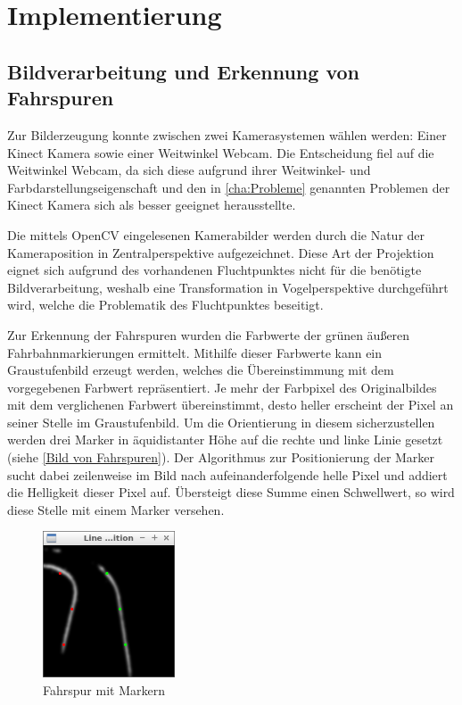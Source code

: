 \section{Implementierung}
\label{cha:Implementierung}
\subsection{Bildverarbeitung und Erkennung von Fahrspuren}
\label{sec:spurerkennung}

Zur Bilderzeugung konnte zwischen zwei Kamerasystemen wählen werden: Einer Kinect Kamera sowie einer Weitwinkel Webcam. Die Entscheidung fiel auf die Weitwinkel Webcam, da sich diese aufgrund ihrer Weitwinkel- und Farbdarstellungseigenschaft und den in \autoref{cha:Probleme} genannten Problemen der Kinect Kamera sich als besser geeignet herausstellte. 

Die mittels OpenCV eingelesenen Kamerabilder werden durch die Natur der Kameraposition in Zentralperspektive aufgezeichnet. Diese Art der Projektion eignet sich aufgrund des vorhandenen Fluchtpunktes nicht für die benötigte Bildverarbeitung, weshalb eine Transformation in Vogelperspektive durchgeführt wird, welche die Problematik des Fluchtpunktes beseitigt.

Zur Erkennung der Fahrspuren wurden die Farbwerte der grünen äußeren Fahrbahnmarkierungen ermittelt. Mithilfe dieser Farbwerte kann ein Graustufenbild erzeugt werden, welches die Übereinstimmung mit dem vorgegebenen Farbwert repräsentiert. Je mehr der Farbpixel des Originalbildes mit dem verglichenen Farbwert übereinstimmt, desto heller erscheint der Pixel an seiner Stelle im Graustufenbild. Um die Orientierung in diesem sicherzustellen werden drei Marker in äquidistanter Höhe auf die rechte und linke Linie gesetzt (siehe \autoref{Bild von Fahrspuren}). Der Algorithmus zur Positionierung der Marker sucht dabei zeilenweise im Bild nach aufeinanderfolgende helle Pixel und addiert die Helligkeit dieser Pixel auf. Übersteigt diese Summe einen Schwellwert, so wird diese Stelle mit einem Marker versehen.

\begin{figure}[ht]
	\centering
	\includegraphics[width=0.35\textwidth]{images/isnt_straight_original.png}
	\caption{Fahrspur mit Markern}
\end{figure}
\label{Bild von Fahrspuren}

